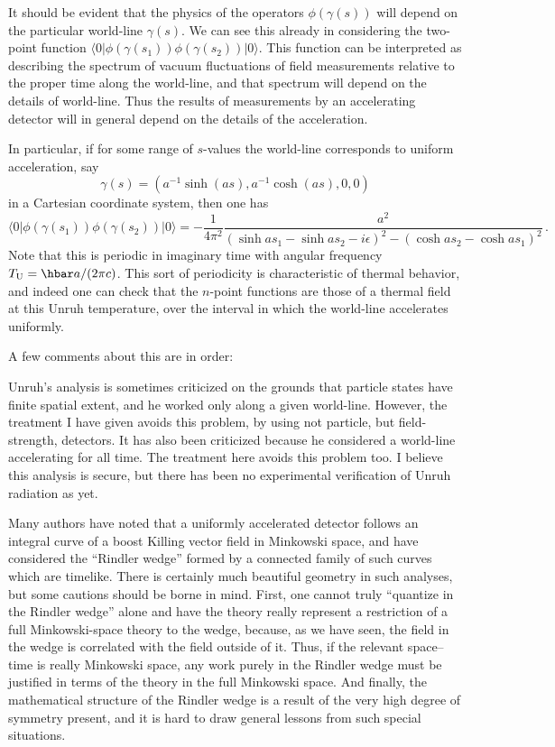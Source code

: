 \documentclass[
%
draft    %
,numberedheadings 
,bibliocites
  ]
  {aipproc}
\begin{document}
It should be evident that the physics of the operators $\phi (\gamma (s))$ will depend on the particular world-line $\gamma (s)$.  We can see this already in considering the two-point function
$\langle 0|\phi (\gamma (s_1))\phi (\gamma (s_2))|0\rangle$.
This function can be interpreted as describing the spectrum of vacuum fluctuations of field measurements relative to the proper time along the world-line, and that spectrum will depend on the details of world-line.   Thus the results of measurements by an accelerating detector will in general depend on the details of the acceleration.

In particular, if for some range of $s$-values the world-line corresponds to uniform acceleration, say
\begin{equation}
  \gamma (s) =(a^{-1}\sinh (as),a^{-1}\cosh (as),0,0) 
\end{equation}
in a Cartesian coordinate system, then one has
\begin{equation}
\langle 0|\phi (\gamma (s_1))\phi (\gamma (s_2))|0\rangle =
 -\frac{1}{4\pi^2}\frac{a^2}{(\sinh as_1-\sinh as_2 -i\epsilon )^2-(\cosh as_2-\cosh as_1)^2}\, .
\end{equation}
Note that this is periodic in imaginary time with angular frequency $T_{\rm U}=\hbar a/(2\pi c)$.  This sort of periodicity is characteristic of thermal behavior, and indeed one can check that the $n$-point functions are those of a thermal field at this Unruh temperature, over the interval in which the world-line accelerates uniformly.

A few comments about this are in order:

Unruh's analysis is sometimes criticized on the grounds that particle states have finite spatial extent, and he worked only along a given world-line.  However, the treatment I have given avoids this problem, by using not particle, but field-strength, detectors.  
It has also been criticized because he considered a world-line accelerating for all time.  The treatment here avoids this problem too.
I believe this analysis is secure, but there has been no experimental verification of Unruh radiation as yet.


Many authors have noted that a uniformly accelerated detector follows an integral curve of a boost Killing vector field in Minkowski space, and have considered the ``Rindler wedge'' formed by a connected family of such curves which are timelike.  There is certainly much beautiful geometry in such analyses, but some cautions should be borne in mind.  First, one cannot truly ``quantize in the Rindler wedge'' alone and have the theory really represent a restriction of a full Minkowski-space theory to the wedge, because, as we have seen, the field in the wedge is correlated with the field outside of it.  Thus, if the relevant space--time is really Minkowski space, any work purely in the Rindler wedge must be justified in terms of the theory in the full Minkowski space.  And finally, the mathematical structure of the Rindler wedge is a result of the very high degree of symmetry present, and it is hard to draw general lessons from such special situations.
\end{document}
